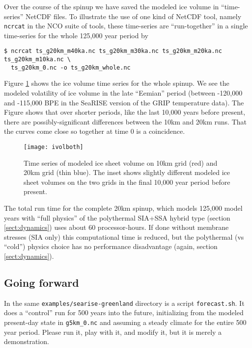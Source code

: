 Over the course of the spinup we have saved the modeled ice volume in ``time-series'' NetCDF files.  To illustrate the use of one kind of NetCDF tool, namely \verb|ncrcat| in the NCO suite of tools, these time-series are ``run-together'' in a single time-series for the whole 125,000 year period by
\begin{verbatim}
$ ncrcat ts_g20km_m40ka.nc ts_g20km_m30ka.nc ts_g20km_m20ka.nc ts_g20km_m10ka.nc \
  ts_g20km_0.nc -o ts_g20km_whole.nc
\end{verbatim}
\noindent Figure \ref{fig:sr-spindone-ivolboth} shows the ice volume time series for the whole spinup.  We see the modeled volatility of ice volume in the late ``Eemian'' period (between -120,000 and -115,000 BPE in the SeaRISE version of the GRIP temperature data).  The Figure shows that over shorter periods, like the last 10,000 years before present, there are possibly-significant differences between the 10km and 20km runs.  That the curves come close so together at time 0 is a coincidence.

\begin{figure}[ht]
\centering
\texttt{[image: ivolboth]}
\caption{Time series of modeled ice sheet volume on 10km grid (red) and 20km grid (thin blue).  The inset shows slightly different modeled ice sheet volumes on the two grids in the final 10,000 year period before present.}
\label{fig:sr-spindone-ivolboth}
\end{figure}

The total run time for the complete 20km spinup, which models 125,000 model years with ``full physics'' of the polythermal SIA+SSA hybrid type (section \ref{sect:dynamics}) uses about 60 processor-hours.  If done without membrane stresses (SIA only) this computational time is reduced, but the polythermal (vs ``cold'') physics choice has no performance disadvantage (again, section \ref{sect:dynamics}).


\subsection{Going forward}  \label{subsect:forecastcaution}  In the same \verb|examples/searise-greenland| directory is a script \verb|forecast.sh|.  It does a ``control'' run for 500 years into the future, initializing from the modeled present-day state in \verb|g5km_0.nc| and assuming a steady climate for the entire 500 year period.  Please run it, play with it, and modify it, but it is merely a demonstration.

